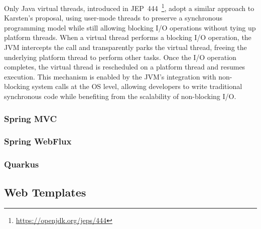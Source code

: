 Only Java virtual threads, introduced in
JEP~444~\footnote{\url{https://openjdk.org/jeps/444}}, adopt a similar approach
to Karsten's proposal, using user-mode threads to preserve a synchronous
programming model while still allowing blocking I/O operations without tying up
platform threads. When a virtual thread performs a blocking I/O operation, the
JVM intercepts the call and transparently parks the virtual thread, freeing the
underlying platform thread to perform other tasks. Once the I/O operation
completes, the virtual thread is rescheduled on a platform thread and resumes
execution. This mechanism is enabled by the JVM's integration with non-blocking
system calls at the OS level, allowing developers to write traditional
synchronous code while benefiting from the scalability of non-blocking I/O.


\subsubsection{Spring MVC}

\subsubsection{Spring WebFlux}

\subsubsection{Quarkus}


\subsection{Web Templates}

